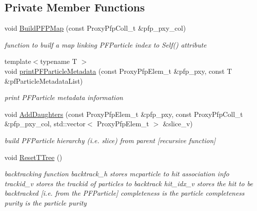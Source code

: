 \subsection*{Private Member Functions}
\begin{DoxyCompactItemize}
\item 
void \hyperlink{classNeutrinoSelectionFilter_a6197e3f1a358b67d7ef2e5a68f0713e9}{Build\+P\+F\+P\+Map} (const Proxy\+Pfp\+Coll\+\_\+t \&pfp\+\_\+pxy\+\_\+col)
\begin{DoxyCompactList}\small\item\em function to builf a map linking P\+F\+Particle index to Self() attribute \end{DoxyCompactList}\item 
{\footnotesize template$<$typename T $>$ }\\void \hyperlink{classNeutrinoSelectionFilter_a15d4d438104af0465749ea02a2dfabfd}{print\+P\+F\+Particle\+Metadata} (const Proxy\+Pfp\+Elem\+\_\+t \&pfp\+\_\+pxy, const T \&pf\+Particle\+Metadata\+List)\hypertarget{classNeutrinoSelectionFilter_a15d4d438104af0465749ea02a2dfabfd}{}\label{classNeutrinoSelectionFilter_a15d4d438104af0465749ea02a2dfabfd}

\begin{DoxyCompactList}\small\item\em print P\+F\+Particle metadata information \end{DoxyCompactList}\item 
void \hyperlink{classNeutrinoSelectionFilter_a7b59a7f8e5f49bddb677833b4e30e136}{Add\+Daughters} (const Proxy\+Pfp\+Elem\+\_\+t \&pfp\+\_\+pxy, const Proxy\+Pfp\+Coll\+\_\+t \&pfp\+\_\+pxy\+\_\+col, std\+::vector$<$ Proxy\+Pfp\+Elem\+\_\+t $>$ \&slice\+\_\+v)
\begin{DoxyCompactList}\small\item\em build P\+F\+Particle hierarchy (i.\+e. slice) from parent \mbox{[}recursive function\mbox{]} \end{DoxyCompactList}\item 
void \hyperlink{classNeutrinoSelectionFilter_a530acd378dad32bbb0bb9c05ef0a9343}{Reset\+T\+Tree} ()
\begin{DoxyCompactList}\small\item\em backtracking function backtrack\+\_\+h stores mcparticle to hit association info trackid\+\_\+v stores the trackid of particles to backtrack hit\+\_\+idx\+\_\+v stores the hit to be backtracked \mbox{[}i.\+e. from the P\+F\+Particle\mbox{]} completeness is the particle completeness purity is the particle purity \end{DoxyCompactList}\end{DoxyCompactItemize}
